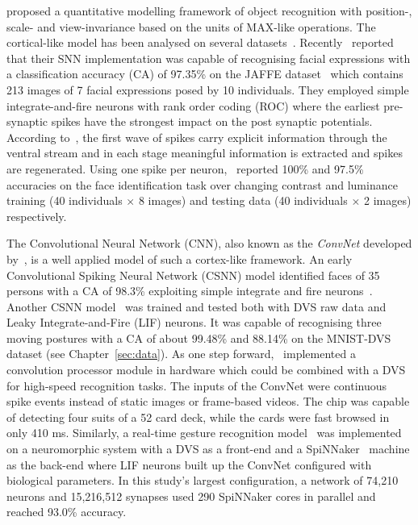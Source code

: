 \documentclass{frontiersENG} %
\begin{document}
\cite{riesenhuber1999hierarchical} proposed a quantitative modelling framework of object recognition with position-, scale- and view-invariance based on the units of MAX-like operations.
The cortical-like model has been analysed on several datasets~\citep{serre2007robust}.
Recently~\cite{fu2012spiking} reported that their SNN implementation was capable of recognising facial expressions with a classification accuracy (CA) of 97.35\% on the JAFFE dataset~\citep{lyons1998coding} which contains 213 images of 7 facial expressions posed by 10 individuals.
They employed simple integrate-and-fire neurons with rank order coding (ROC) where  the earliest pre-synaptic spikes have the strongest impact on the post synaptic potentials.
According to~\cite{vanrullen2002surfing}, the first wave of spikes  carry explicit information through the ventral stream and in each stage meaningful information is extracted and spikes are regenerated. 
Using one spike per neuron,~\cite{delorme2001face} reported 100\% and 97.5\% accuracies on the face identification task over changing  contrast and luminance training (40 individuals $\times$ 8 images) and testing data (40 individuals $\times$ 2 images) respectively.

The Convolutional Neural Network (CNN), also known as the \textit{ConvNet} developed by~\cite{lecun1998gradient}, is a well applied model of such a cortex-like framework.
An early Convolutional Spiking Neural Network (CSNN) model identified faces of 35 persons with a CA of 98.3\% exploiting simple integrate and fire neurons~\citep{matsugu2002convolutional}.
Another CSNN model~\citep{zhao2014feedforward} was trained and tested both with DVS raw data and Leaky Integrate-and-Fire (LIF) neurons.
It was capable of recognising three moving postures with a CA of about 99.48\% and 88.14\% on the MNIST-DVS dataset (see Chapter~\ref{sec:data}).
As one step forward,~\cite{camunas2012event} implemented a convolution processor module in hardware which could be combined with a DVS for high-speed recognition tasks.
The inputs of the ConvNet were continuous spike events instead of static images or frame-based videos. 
The chip was capable of detecting four suits of a 52 card deck, while the cards were fast browsed in only 410 ms.
Similarly, a real-time gesture recognition model~\citep{liu2014real} was implemented on a neuromorphic system with a DVS as a front-end and a SpiNNaker~\citep{furber2014spinnaker} machine as the back-end where LIF neurons built up the ConvNet configured with biological parameters.
In this study's largest configuration, a network of 74,210 neurons and 15,216,512 synapses used 290 SpiNNaker cores in parallel and reached 93.0\% accuracy. 
\end{document}
